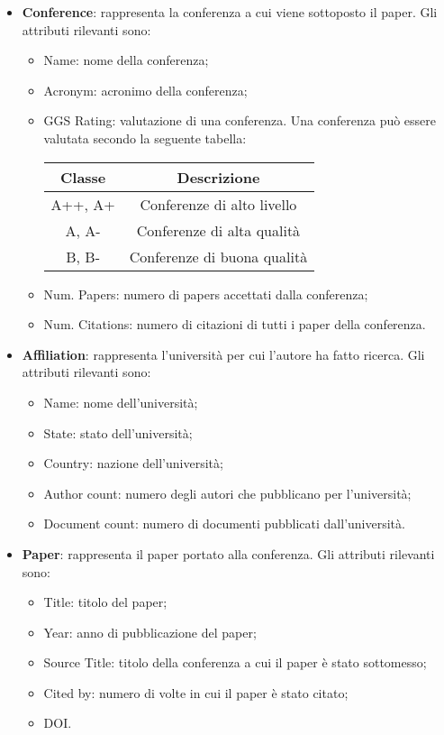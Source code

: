 \begin{itemize}
    \item \textbf{Conference}: rappresenta la conferenza a cui viene sottoposto il paper. Gli attributi rilevanti sono:
    \begin{itemize}
        \item Name: nome della conferenza;
        \item Acronym: acronimo della conferenza;
        \item GGS Rating: valutazione di una conferenza. Una conferenza può essere valutata secondo la seguente tabella:
        \begin{center}
            \begin{tabular}{||c c ||} 
             \hline
             Classe & Descrizione \\ [0.5ex] 
             \hline\hline
             A++, A+ & Conferenze di alto livello \\ 
             \hline
             A, A- & Conferenze di alta qualità \\
             \hline
             B, B- & Conferenze di buona qualità \\ [1ex] 
             \hline
            \end{tabular}
        \end{center}
        \item Num. Papers: numero di papers accettati dalla conferenza;
        \item Num. Citations: numero di citazioni di tutti i paper della conferenza.
    \end{itemize}

    \item \textbf{Affiliation}: rappresenta l'università per cui l'autore ha fatto ricerca. Gli attributi rilevanti sono:
    \begin{itemize}
        \item Name: nome dell'università;
        \item State: stato dell'università;
        \item Country: nazione dell'università;
        \item Author count: numero degli autori che pubblicano per l'università;
        \item Document count: numero di documenti pubblicati dall'università.
    \end{itemize}

    \item \textbf{Paper}: rappresenta il paper portato alla conferenza. Gli attributi rilevanti sono:
    \begin{itemize}
        \item Title: titolo del paper;
        \item Year: anno di pubblicazione del paper;
        \item Source Title: titolo della conferenza a cui il paper è stato sottomesso;
        \item Cited by: numero di volte in cui il paper è stato citato;
        \item DOI.
    \end{itemize}


\end{itemize}
